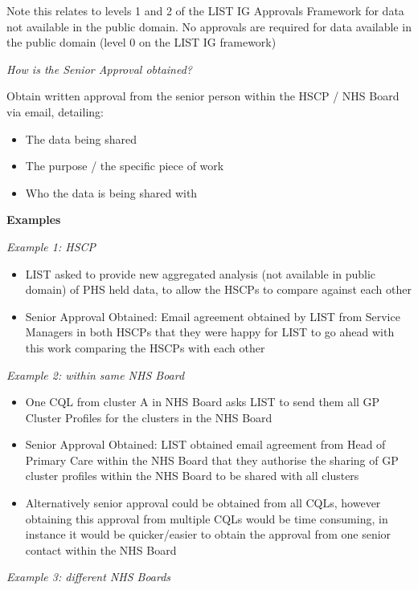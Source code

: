 \documentclass[
]{book}
\begin{document}
Note this relates to levels 1 and 2 of the LIST IG Approvals Framework for data not available in the public domain. No approvals are required for data available in the public domain (level 0 on the LIST IG framework)

\emph{How is the Senior Approval obtained?}

Obtain written approval from the senior person within the HSCP / NHS Board via email, detailing:

\begin{itemize}
\item
  The data being shared
\item
  The purpose / the specific piece of work
\item
  Who the data is being shared with
\end{itemize}

\textbf{Examples}

\emph{Example 1: HSCP}

\begin{itemize}
\item
  LIST asked to provide new aggregated analysis (not available in public domain) of PHS held data, to allow the HSCPs to compare against each other
\item
  Senior Approval Obtained: Email agreement obtained by LIST from Service Managers in both HSCPs that they were happy for LIST to go ahead with this work comparing the HSCPs with each other
\end{itemize}

\emph{Example 2: within same NHS Board}

\begin{itemize}
\item
  One CQL from cluster A in NHS Board asks LIST to send them all GP Cluster Profiles for the clusters in the NHS Board
\item
  Senior Approval Obtained: LIST obtained email agreement from Head of Primary Care within the NHS Board that they authorise the sharing of GP cluster profiles within the NHS Board to be shared with all clusters
\item
  Alternatively senior approval could be obtained from all CQLs, however obtaining this approval from multiple CQLs would be time consuming, in instance it would be quicker/easier to obtain the approval from one senior contact within the NHS Board
\end{itemize}

\emph{Example 3: different NHS Boards}
\end{document}
